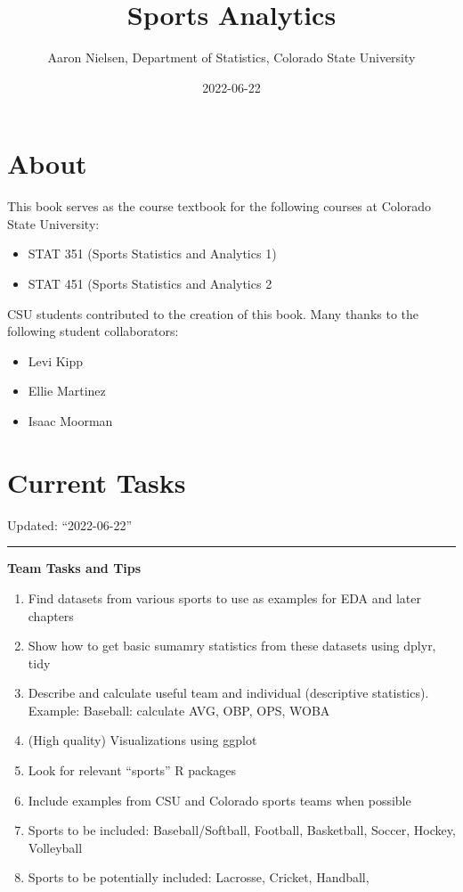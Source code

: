 \documentclass[
  11pt,
]{book}
\title{Sports Analytics}
\author{Aaron Nielsen, Department of Statistics, Colorado State University}
\date{2022-06-22}
\providecommand{\tightlist}{%
  \setlength{\itemsep}{0pt}\setlength{\parskip}{0pt}}
\theoremstyle{definition}
\theoremstyle{definition}
\theoremstyle{definition}
\theoremstyle{definition}
\theoremstyle{remark}
\begin{document}
\maketitle

{
\setcounter{tocdepth}{1}
\tableofcontents
}
\hypertarget{about}{%
\chapter*{About}\label{about}}

This book serves as the course textbook for the following courses at Colorado State University:

\begin{itemize}
\item
  STAT 351 (Sports Statistics and Analytics 1)
\item
  STAT 451 (Sports Statistics and Analytics 2
\end{itemize}

\hfill\break

CSU students contributed to the creation of this book. Many thanks to the following student collaborators:

\begin{itemize}
\item
  Levi Kipp
\item
  Ellie Martinez
\item
  Isaac Moorman
\end{itemize}

\hypertarget{current-tasks}{%
\chapter*{Current Tasks}\label{current-tasks}}

Updated: ``2022-06-22''

\begin{center}\rule{0.5\linewidth}{0.5pt}\end{center}

\textbf{Team Tasks and Tips}

\begin{enumerate}
\def\labelenumi{\arabic{enumi}.}
\tightlist
\item
  Find datasets from various sports to use as examples for EDA and later chapters
\item
  Show how to get basic sumamry statistics from these datasets using dplyr, tidy
\item
  Describe and calculate useful team and individual (descriptive statistics). Example: Baseball: calculate AVG, OBP, OPS, WOBA
\item
  (High quality) Visualizations using ggplot
\item
  Look for relevant ``sports'' R packages
\item
  Include examples from CSU and Colorado sports teams when possible
\item
  Sports to be included: Baseball/Softball, Football, Basketball, Soccer, Hockey, Volleyball
\item
  Sports to be potentially included: Lacrosse, Cricket, Handball,
\end{enumerate}
\end{document}

